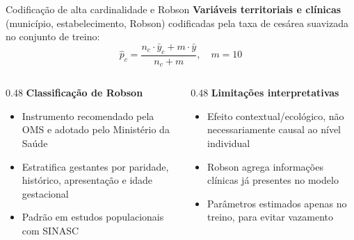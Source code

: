 \documentclass[aspectratio=169,xcolor=table]{beamer}
\begin{document}
\begin{frame}{Codificação de alta cardinalidade e Robson}
    \textbf{Variáveis territoriais e clínicas} (município, estabelecimento, Robson) codificadas pela taxa de cesárea suavizada no conjunto de treino:
    \[
        \hat{p}_c = \frac{n_c \cdot \bar{y}_c + m \cdot \bar{y}}{n_c + m}, \quad m = 10
    \]

    \vspace{0.3em}
    \begin{columns}[T]
        \begin{column}{0.48\textwidth}
            \textbf{Classificação de Robson}
            \begin{itemize}
                \item Instrumento recomendado pela OMS e adotado pelo Ministério da Saúde
                \item Estratifica gestantes por paridade, histórico, apresentação e idade gestacional
                \item Padrão em estudos populacionais com SINASC
            \end{itemize}
        \end{column}
        \begin{column}{0.48\textwidth}
            \textbf{Limitações interpretativas}
            \begin{itemize}
                \item Efeito contextual/ecológico, não necessariamente causal ao nível individual
                \item Robson agrega informações clínicas já presentes no modelo
                \item Parâmetros estimados apenas no treino, para evitar vazamento
            \end{itemize}
        \end{column}
    \end{columns}
\end{frame}
\end{document}
